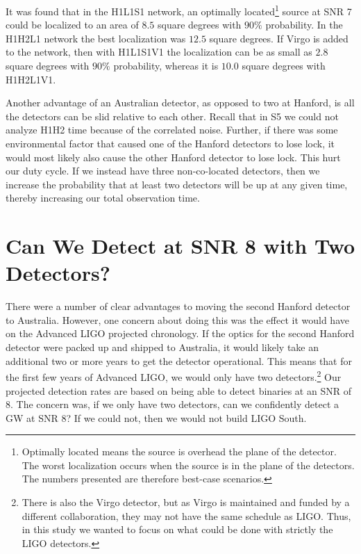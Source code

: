 It was found \cite{ref:steve_triangulation_wiki} that in the H1L1S1 network, an optimally located\footnote{Optimally located means the source is overhead the plane of the detector. The worst localization occurs when the source is in the plane of the detectors. The numbers presented are therefore best-case scenarios.} source at \ac{SNR} 7 could be localized to an area of $8.5$ square degrees with $90\%$ probability. In the H1H2L1 network the best localization was $12.5$ square degrees. If Virgo is added to the network, then with H1L1S1V1 the localization can be as small as $2.8$ square degrees with $90\%$ probability, whereas it is $10.0$ square degrees with H1H2L1V1.

Another advantage of an Australian detector, as opposed to two at Hanford, is all the detectors can be slid relative to each other. Recall that in \ac{S5} we could not analyze H1H2 time because of the correlated noise. Further, if there was some environmental factor that caused one of the Hanford detectors to lose lock, it would most likely also cause the other Hanford detector to lose lock. This hurt our duty cycle. If we instead have three non-co-located detectors, then we increase the probability that at least two detectors will be up at any given time, thereby increasing our total observation time.

\section{Can We Detect at SNR 8 with Two Detectors?}

There were a number of clear advantages to moving the second Hanford detector to Australia. However, one concern about doing this was the effect it would have on the Advanced LIGO projected chronology. If the optics for the second Hanford detector were packed up and shipped to Australia, it would likely take an additional two or more years to get the detector operational. This means that for the first few years of Advanced \ac{LIGO}, we would only have two detectors.\footnote{There is also the Virgo detector, but as Virgo is maintained and funded by a different collaboration, they may not have the same schedule as \ac{LIGO}. Thus, in this study we wanted to focus on what could be done with strictly the \ac{LIGO} detectors.} Our projected detection rates are based on being able to detect binaries at an \ac{SNR} of $8$. The concern was, if we only have two detectors, can we confidently detect a \ac{GW} at \ac{SNR} $8$? If we could not, then we would not build \ac{LIGO} South.

